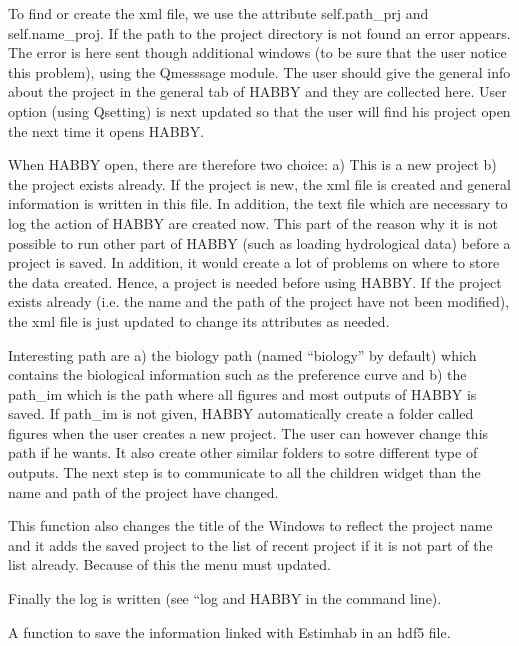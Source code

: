 \documentclass[letterpaper,10pt,english]{sphinxmanual}
\begin{document}
\begin{fulllineitems}
\begin{fulllineitems}
To find or create the xml file, we use the attribute self.path\_prj and self.name\_proj. If the path to
the project directory is not found an error appears. The error is here sent though additional windows
(to be sure that the user notice this problem), using the Qmesssage module. The user should give the general
info about the project in the general tab of HABBY and they are collected here. User option (using Qsetting)
is next updated so that the user will find his project open the next time it opens HABBY.

When HABBY open, there are therefore  two choice: a) This is a new project b) the project exists already.
If the project is new, the xml file is created and general information is written in this file. In addition,
the text file which are necessary to log the action of HABBY are created now. This part of the reason why it
is not possible to run other part of HABBY (such as loading hydrological data) before a project is saved.
In addition, it would create a lot of problems on where to store the data created. Hence, a project is needed
before using HABBY. If the project exists already (i.e. the name and the path of the project have not been
modified), the xml file is just updated to change its attributes as needed.

Interesting path are a) the biology path (named ``biology'' by default) which contains the biological information
such as the preference curve and b) the path\_im which is the path where all figures and most outputs of HABBY
is saved. If path\_im is not given, HABBY automatically create a folder called figures when the
user creates a new project. The user can however change this path if he wants. It also create other similar
folders to sotre different type of outputs. The next step is to communicate
to all the children widget than the name and path of the project have changed.

This function also changes the title of the Windows to reflect the project name and it adds the saved
project to the list of recent project if it is not part of the list already. Because of this the menu must
updated.

Finally the log is written (see “log and HABBY in the command line).

\end{fulllineitems}


\begin{fulllineitems}
\label{\detokenize{index:src_GUI.Main_windows_1.MainWindows.save_project_estimhab}}
A function to save the information linked with Estimhab in an hdf5 file.


\end{fulllineitems}
\end{fulllineitems}
\end{document}
